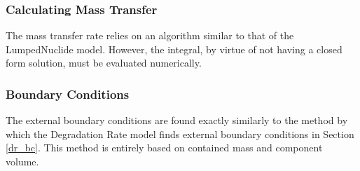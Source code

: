 \subsubsection{Calculating Mass Transfer}
The mass transfer rate relies on an algorithm similar to that of the 
LumpedNuclide model. However, the integral, by virtue of not having a closed 
form solution, must be evaluated numerically. 


\subsubsection{Boundary Conditions}
The external boundary conditions are found exactly similarly to the method by 
which the Degradation Rate model finds external boundary conditions in Section 
\ref{dr_bc}. This method is entirely based on contained mass and component 
volume.  
